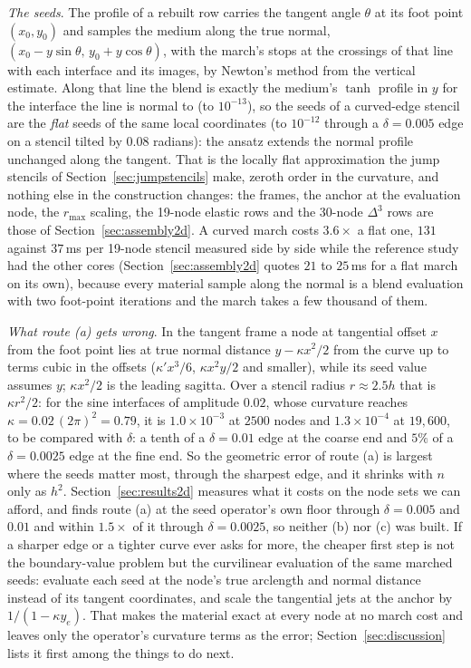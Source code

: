 \documentclass[11pt]{amsart}
\theoremstyle{definition}
\theoremstyle{remark}
\newcommand{\para}[1]{\par\smallskip\noindent\textit{#1}.\enspace}
\begin{document}
\para{The seeds}
The profile of a rebuilt row carries the tangent angle $\theta$ at its
foot point $(x_0, y_0)$ and samples the medium along the true normal,
$(x_0 - y \sin\theta,\, y_0 + y \cos\theta)$, with the march's stops at
the crossings of that line with each interface and its images, by
Newton's method from the vertical estimate. Along that line the blend
is exactly the medium's $\tanh$ profile in $y$ for the interface the
line is normal to (to $10^{-13}$), so the seeds of a curved-edge
stencil are the \emph{flat} seeds of the same local coordinates (to
$10^{-12}$ through a $\delta = 0.005$ edge on a stencil tilted by $0.08$
radians): the ansatz extends the normal profile unchanged along the
tangent. That is the locally flat approximation the jump stencils of
Section~\ref{sec:jumpstencils} make, zeroth order in the curvature, and
nothing else in the construction changes: the frames, the anchor at the
evaluation node, the $r_{\max}$ scaling, the 19-node elastic rows and
the 30-node $\Delta^3$ rows are those of Section~\ref{sec:assembly2d}.
A curved march costs $3.6\times$ a flat one, $131$ against $37$\,ms per
19-node stencil measured side by side while the reference study had the
other cores (Section~\ref{sec:assembly2d} quotes $21$ to $25$\,ms for a
flat march on its own), because every material sample along the normal is a
blend evaluation with two foot-point iterations and the march takes a
few thousand of them.

\para{What route (a) gets wrong}
In the tangent frame a node at tangential offset $x$ from the foot
point lies at true normal distance $y - \kappa x^2 / 2$ from the curve up
to terms cubic in the offsets ($\kappa' x^3 / 6$, $\kappa x^2 y / 2$ and
smaller), while its seed value assumes $y$; $\kappa x^2 / 2$ is the
leading sagitta. Over a stencil radius
$r \approx 2.5h$ that is $\kappa r^2 / 2$: for the sine interfaces of
amplitude $0.02$, whose curvature reaches $\kappa = 0.02\,(2\pi)^2 =
0.79$, it is $1.0 \times 10^{-3}$ at $2500$ nodes and $1.3 \times 10^{-4}$
at $19{,}600$, to be compared with $\delta$: a tenth of a $\delta = 0.01$
edge at the coarse end and $5\%$ of a $\delta = 0.0025$ edge at the fine
end. So the geometric error of route (a) is largest where the seeds
matter most, through the sharpest edge, and it shrinks with $n$ only as
$h^2$. Section~\ref{sec:results2d} measures what it costs on the node
sets we can afford, and finds route (a) at the seed operator's own floor
through $\delta = 0.005$ and $0.01$ and within $1.5\times$ of it through
$\delta = 0.0025$, so neither (b) nor (c) was built. If a sharper edge or a
tighter curve ever asks for more, the cheaper first step is not the
boundary-value problem but the curvilinear evaluation of the same
marched seeds: evaluate each seed at the node's true arclength and
normal distance instead of its tangent coordinates, and scale the
tangential jets at the anchor by $1 / (1 - \kappa y_e)$. That makes the
material exact at every node at no march cost and leaves only the
operator's curvature terms as the error; Section~\ref{sec:discussion}
lists it first among the things to do next.
\end{document}
